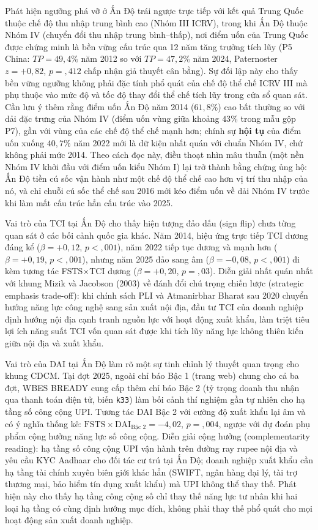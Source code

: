 \documentclass[
  a4paper,
  13pt]{extreport}
\begin{document}
Phát hiện ngưỡng phá vỡ ở Ấn Độ trái ngược trực tiếp với kết quả Trung
Quốc thuộc chế độ thu nhập trung bình cao (Nhóm III ICRV), trong khi Ấn
Độ thuộc Nhóm IV (chuyển đổi thu nhập trung bình--thấp), nơi điểm uốn
của Trung Quốc được chứng minh là bền vững cấu trúc qua 12 năm tăng
trưởng tích lũy (P5 China: \(TP = 49{,}4\%\) năm 2012 so với
\(TP = 47{,}2\%\) năm 2024, Paternoster \(z = +{0,}82\), \(p = {,}412\)
chấp nhận giả thuyết cân bằng). Sự đối lập này cho thấy bền vững ngưỡng
không phải đặc tính phổ quát của chế độ thể chế ICRV III mà phụ thuộc
vào mức độ và tốc độ thay đổi thể chế tích lũy trong cửa sổ quan sát.
Cần lưu ý thêm rằng điểm uốn Ấn Độ năm 2014 (\(61{,}8\%\)) cao bất
thường so với dải đặc trưng của Nhóm IV (điểm uốn vùng giữa khoảng
\(43\%\) trong mẫu gộp P7), gần với vùng của các chế độ thể chế mạnh
hơn; chính sự \textbf{hội tụ} của điểm uốn xuống \(40{,}7\%\) năm 2022
mới là dữ kiện nhất quán với chuẩn Nhóm IV, chứ không phải mức 2014.
Theo cách đọc này, điều thoạt nhìn mâu thuẫn (một nền Nhóm IV khởi đầu
với điểm uốn kiểu Nhóm I) lại trở thành bằng chứng ủng hộ: Ấn Độ tiền cú
sốc vận hành như một chế độ thể chế cao hơn vị trí thu nhập của nó, và
chỉ chuỗi cú sốc thể chế sau 2016 mới kéo điểm uốn về dải Nhóm IV trước
khi làm mất cấu trúc hẳn cấu trúc vào 2025.

Vai trò của TCI tại Ấn Độ cho thấy hiện tượng đảo dấu (sign flip) chưa
từng quan sát ở các bối cảnh quốc gia khác. Năm 2014, hiệu ứng trực tiếp
TCI dương đáng kể (\(\beta = +0{,}12\), \(p < {,}001\)), năm 2022 tiếp
tục dương và mạnh hơn (\(\beta = +0{,}19\), \(p < {,}001\)), nhưng năm
2025 đảo sang âm (\(\beta = -0{,}08\), \(p < {,}001\)) đi kèm tương tác
FSTS\(\times\)TCI dương (\(\beta = +0{,}20\), \(p = {,}03\)). Diễn giải
nhất quán nhất với khung Mizik và Jacobson (2003) về đánh đổi chú trọng
chiến lược (strategic emphasis trade-off): khi chính sách PLI và
Atmanirbhar Bharat sau 2020 chuyển hướng năng lực công nghệ sang sản
xuất nội địa, đầu tư TCI của doanh nghiệp định hướng nội địa cạnh tranh
nguồn lực với hoạt động xuất khẩu, làm triệt tiêu lợi ích năng suất TCI
vốn quan sát được khi tích lũy năng lực không thiên kiến giữa nội địa và
xuất khẩu.

Vai trò của DAI tại Ấn Độ làm rõ một sự tinh chỉnh lý thuyết quan trọng
cho khung CDCM. Tại đợt 2025, ngoài chỉ báo Bậc 1 (trang web) chung cho
cả ba đợt, WBES BREADY cung cấp thêm chỉ báo Bậc 2 (tỷ trọng doanh thu
nhận qua thanh toán điện tử, biến \texttt{k33}) làm bối cảnh thí nghiệm
gần tự nhiên cho hạ tầng số công cộng UPI. Tương tác DAI Bậc 2 với cường
độ xuất khẩu lại âm và có ý nghĩa thống kê:
\(\text{FSTS} \times \text{DAI}_{\text{Bậc 2}} = -4{,}02\),
\(p = {,}004\), ngược với dự đoán phụ phẩm cộng hưởng năng lực số công
cộng. Diễn giải cộng hưởng (complementarity reading): hạ tầng số công
cộng UPI vận hành trên đường ray rupee nội địa và yêu cầu KYC Aadhaar
cho đối tác cư trú tại Ấn Độ; doanh nghiệp xuất khẩu cần hạ tầng tài
chính xuyên biên giới khác hẳn (SWIFT, ngân hàng đại lý, tài trợ thương
mại, bảo hiểm tín dụng xuất khẩu) mà UPI không thể thay thế. Phát hiện
này cho thấy hạ tầng công cộng số chỉ thay thế năng lực tư nhân khi hai
loại hạ tầng có cùng định hướng mục đích, không phải thay thế phổ quát
cho mọi hoạt động sản xuất doanh nghiệp.
\end{document}
